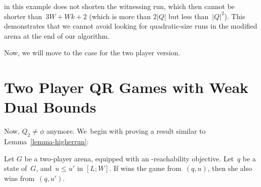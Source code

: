 \begin{example}
    in this example does not shorten the witnessing run, which then cannot be shorter than~$3W+Wk+2$ (which is more than $2|Q|$ but less than~$|Q|^2$). This demonstrates that we cannot avoid looking for quadratic-size runs in the modified arena at the end of our algorithm.
    \end{example}

    Now, we will move to the case for the two player version.

 
\section{Two Player QR Games with Weak Dual Bounds}

    Now, $Q_2 \not = \phi$ anymore. We~begin with proving a result
    similar to Lemma~\ref{lemma-higherrun}:
    \begin{lemma}
    \label{lemma-higherstrat}
      Let $G$ be a two-player arena, equipped with an \LWenergy-reachability
      objective. Let~$q$ be a state of~$G$, and~$u\leq u'$ in $[L;W]$. If
       wins the game from~$(q,u)$, then she also wins from~$(q,u')$.
    \end{lemma}
    
